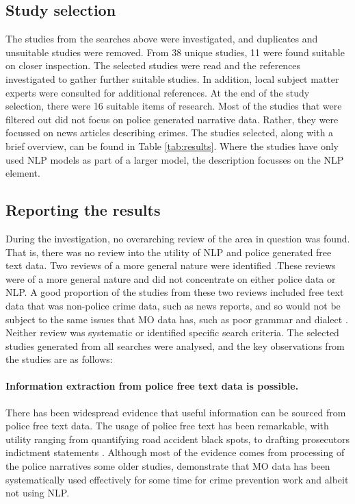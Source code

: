 \subsection{Study selection} The studies from the searches above were investigated, and duplicates and unsuitable studies were removed. From 38 unique studies, 11 were found suitable on closer inspection. The selected studies were read and the references investigated to gather further suitable studies. In addition, local subject matter experts were consulted for additional references. At the end of the study selection, there were 16 suitable items of research. Most of the studies that were filtered out did not focus on police generated narrative data. Rather, they were focussed on news articles describing crimes. The studies selected, along with a brief overview, can be found in Table \ref{tab:results}. Where the studies have only used NLP models as part of a larger model, the description focusses on the NLP element.


\subsection{Reporting the results}

During the investigation, no overarching review of the area in question was found. That is, there was no review into the utility of  NLP and police generated free text data. Two reviews of a more general nature were identified \parencite{krishnamurthy2012survey, hassani2016review}.These reviews were of a more general nature and did not concentrate on either police data or NLP. A good proportion of the studies from these two reviews included free text data that was non-police crime data, such as news reports, and so would not be subject to the same issues that MO data has, such as poor grammar and dialect  \parencite{Keyvanpour2011872}. Neither review was systematic or identified specific search criteria. The selected studies generated from all searches were analysed, and the key observations from the studies are as follows:

\paragraph{Information extraction from police free text data is possible.} There has been widespread evidence that useful information can be sourced from police free text data. The usage of police free text has been remarkable, with utility ranging from quantifying road accident black spots,\parencite{Krause2019} to drafting prosecutors indictment statements \parencite{chen2010use}. Although most of the evidence comes from processing of the police narratives some older studies, demonstrate that MO data has been systematically used effectively for some time for crime prevention work \textcite{bowers2004commits} and \parencite{adderley2003modus} albeit not using NLP. 


